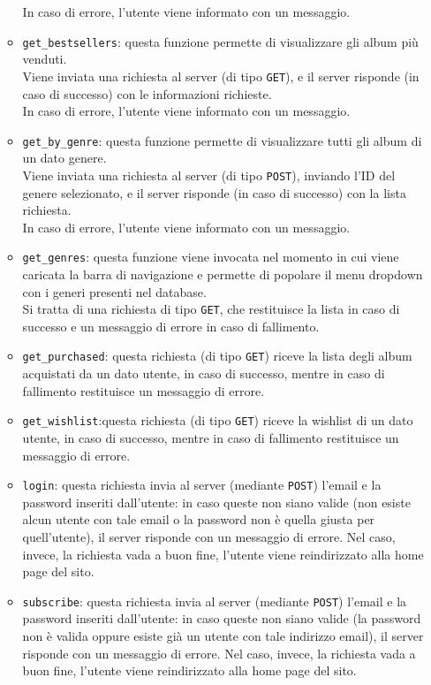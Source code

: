 \begin{itemize}
\begin{itemize}
            In caso di errore, l'utente viene informato con un messaggio.
            \item \texttt{get\_bestsellers}: questa funzione permette di visualizzare gli album più venduti.\\
            Viene inviata una richiesta al server (di tipo \texttt{GET}), e il server risponde (in caso di successo) con le informazioni richieste.\\
            In caso di errore, l'utente viene informato con un messaggio.
            \item \texttt{get\_by\_genre}: questa funzione permette di visualizzare tutti gli album di un dato genere.\\
            Viene inviata una richiesta al server (di tipo \texttt{POST}), inviando l'ID del genere selezionato, e il server risponde (in caso di successo) con la lista richiesta.\\
            In caso di errore, l'utente viene informato con un messaggio.
            \item \texttt{get\_genres}: questa funzione viene invocata nel momento in cui viene caricata la barra di navigazione e permette di popolare il menu dropdown con i generi presenti nel database.\\
            Si tratta di una richiesta di tipo \texttt{GET}, che restituisce la lista in caso di successo e un messaggio di errore in caso di fallimento.
            \item \texttt{get\_purchased}: questa richiesta (di tipo \texttt{GET}) riceve la lista degli album acquistati da un dato utente, in caso di successo, mentre in caso di fallimento restituisce un messaggio di errore. 
            \item \texttt{get\_wishlist}:questa richiesta (di tipo \texttt{GET}) riceve la wishlist di un dato utente, in caso di successo, mentre in caso di fallimento restituisce un messaggio di errore. 
            \item \texttt{login}: questa richiesta invia al server (mediante \texttt{POST}) l'email e la password inseriti dall'utente: in caso queste non siano valide (non esiste alcun utente con tale email o la password non è quella giusta per quell'utente), il server risponde con un messaggio di errore. Nel caso, invece, la richiesta vada a buon fine, l'utente viene reindirizzato alla home page del sito.
            \item \texttt{subscribe}: questa richiesta invia al server (mediante \texttt{POST}) l'email e la password inseriti dall'utente: in caso queste non siano valide (la password non è valida oppure esiste già un utente con tale indirizzo email), il server risponde con un messaggio di errore. Nel caso, invece, la richiesta vada a buon fine, l'utente viene reindirizzato alla home page del sito. 
        \end{itemize}
\end{itemize}